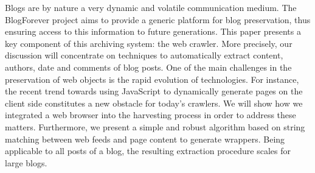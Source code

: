 Blogs are by nature a very dynamic and volatile communication medium. The
BlogForever project aims to provide a generic platform for blog preservation,
thus ensuring access to this information to future generations. This paper
presents a key component of this archiving system: the web crawler. More
precisely, our discussion will concentrate on techniques to automatically
extract content, authors, date and comments of blog posts. One of the main
challenges in the preservation of web objects is the rapid evolution of
technologies. For instance, the recent trend towards using JavaScript to
dynamically generate pages on the client side constitutes a new obstacle for
today's crawlers. We will show how we integrated a web browser into the
harvesting process in order to address these matters. Furthermore, we present a
simple and robust algorithm based on string matching between web feeds and page
content to generate wrappers. Being applicable to all posts of a blog, the
resulting extraction procedure scales for large blogs.
